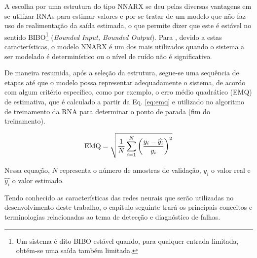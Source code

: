 A escolha por uma estrutura do tipo NNARX se deu pelas diversas vantagens em se
utilizar RNAs para estimar valores e por se tratar de um modelo que não faz uso
de realimentação da saída estimada, o que permite dizer que este é estável no
sentido BIBO\footnote{Um sistema é dito BIBO estável quando, para qualquer
entrada limitada, obtém-se uma saída também limitada.} ({\it Bounded Input,
Bounded Output}). Para , devido a estas
características, o modelo NNARX é um dos mais utilizados quando o sistema a ser
modelado é determinístico ou o nível de ruído não é significativo.


De maneira resumida, após a seleção da estrutura, segue-se uma sequência de
etapas até que o modelo possa representar adequadamente o sistema, de acordo com
algum critério específico, como por exemplo, o erro médio quadrático (EMQ) de
estimativa, que é calculado a partir da Eq. \ref{eq:emq} e utilizado no
algoritmo de treinamento da RNA para determinar o ponto de parada (fim do
treinamento).


\begin{equation}\label{eq:emq}
\text{EMQ} = \sqrt{\frac{1}{N}
             \sum_{i=1}^{N}\left(\frac{y_i - \widehat{y_i}}{y_i}\right)^2}
\end{equation}

Nessa equação, $N$ representa o número de amostras de validação, $y_i$ o valor
real e $\widehat{y_i}$ o valor estimado.


Tendo conhecido as características das redes neurais que serão utilizadas no
desenvolvimento deste trabalho, o capítulo seguinte trará os principais
conceitos e terminologias relacionadas ao tema de detecção e diagnóstico de
falhas.
